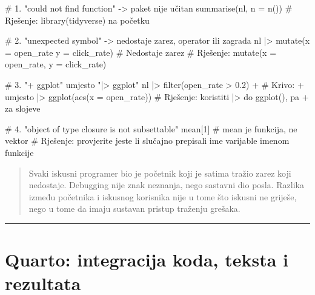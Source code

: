 \documentclass[
  croatian,
  letterpaper,
  DIV=11,
  numbers=noendperiod]{scrartcl}
\newenvironment{Shaded}{\begin{snugshade}}{\end{snugshade}}
\newcommand{\AttributeTok}[1]{\textcolor[rgb]{0.40,0.45,0.13}{#1}}
\newcommand{\CommentTok}[1]{\textcolor[rgb]{0.37,0.37,0.37}{#1}}
\newcommand{\DecValTok}[1]{\textcolor[rgb]{0.68,0.00,0.00}{#1}}
\newcommand{\FloatTok}[1]{\textcolor[rgb]{0.68,0.00,0.00}{#1}}
\newcommand{\FunctionTok}[1]{\textcolor[rgb]{0.28,0.35,0.67}{#1}}
\newcommand{\NormalTok}[1]{\textcolor[rgb]{0.00,0.23,0.31}{#1}}
\newcommand{\SpecialCharTok}[1]{\textcolor[rgb]{0.37,0.37,0.37}{#1}}
\begin{document}
\begin{Shaded}
\begin{Highlighting}[]
\CommentTok{\# 1. "could not find function" {-}\textgreater{} paket nije učitan}
\FunctionTok{summarise}\NormalTok{(nl, }\AttributeTok{n =} \FunctionTok{n}\NormalTok{())}
\CommentTok{\# Rješenje: library(tidyverse) na početku}

\CommentTok{\# 2. "unexpected symbol" {-}\textgreater{} nedostaje zarez, operator ili zagrada}
\NormalTok{nl }\SpecialCharTok{|\textgreater{}}
  \FunctionTok{mutate}\NormalTok{(}\AttributeTok{x =}\NormalTok{ open\_rate }\AttributeTok{y =}\NormalTok{ click\_rate)  }\CommentTok{\# Nedostaje zarez}
\CommentTok{\# Rješenje: mutate(x = open\_rate, y = click\_rate)}

\CommentTok{\# 3. "+ ggplot" umjesto "|\textgreater{} ggplot"}
\NormalTok{nl }\SpecialCharTok{|\textgreater{}}
  \FunctionTok{filter}\NormalTok{(open\_rate }\SpecialCharTok{\textgreater{}} \FloatTok{0.2}\NormalTok{) }\SpecialCharTok{+}  \CommentTok{\# Krivo: + umjesto |\textgreater{}}
  \FunctionTok{ggplot}\NormalTok{(}\FunctionTok{aes}\NormalTok{(}\AttributeTok{x =}\NormalTok{ open\_rate))}
\CommentTok{\# Rješenje: koristiti |\textgreater{} do ggplot(), pa + za slojeve}

\CommentTok{\# 4. "object of type \textquotesingle{}closure\textquotesingle{} is not subsettable"}
\NormalTok{mean[}\DecValTok{1}\NormalTok{]  }\CommentTok{\# mean je funkcija, ne vektor}
\CommentTok{\# Rješenje: provjerite jeste li slučajno prepisali ime varijable imenom funkcije}
\end{Highlighting}
\end{Shaded}

\begin{quote}
Svaki iskusni programer bio je početnik koji je satima tražio zarez koji
nedostaje. Debugging nije znak neznanja, nego sastavni dio posla.
Razlika između početnika i iskusnog korisnika nije u tome što iskusni ne
griješe, nego u tome da imaju sustavan pristup traženju grešaka.
\end{quote}

\begin{center}\rule{0.5\linewidth}{0.5pt}\end{center}

\section{Quarto: integracija koda, teksta i rezultata}\label{sec-quarto}
\end{document}
